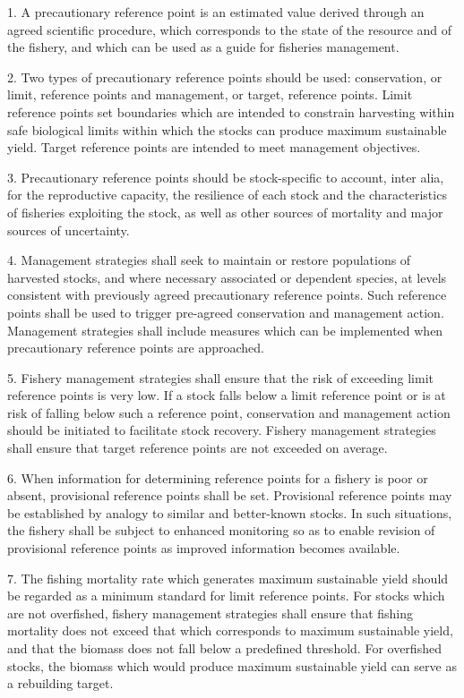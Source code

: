 \documentclass[a4paper,10pt]{article}
\begin{document}
 

1. A precautionary reference point is an estimated value derived through an agreed scientific procedure, which corresponds to the 
state of the resource and of the fishery, and which can be used as a guide for fisheries management.

2. Two types of precautionary reference points should be used: conservation, or limit, reference points and management, or target, 
reference points. Limit reference points set boundaries which are intended to constrain harvesting within safe biological 
limits within which the stocks can produce maximum sustainable yield. Target reference points are intended to meet management objectives.

3. Precautionary reference points should be stock-specific to account, inter alia, for the reproductive capacity, the resilience 
of each stock and the characteristics of fisheries exploiting the stock, as well as other sources of mortality and major sources of uncertainty.

4. Management strategies shall seek to maintain or restore populations of harvested stocks, and where necessary associated or 
dependent species, at levels consistent with previously agreed precautionary reference points. Such reference points shall be 
used to trigger pre-agreed conservation and management action. Management strategies shall include measures which can be implemented when precautionary reference points are approached.

5. Fishery management strategies shall ensure that the risk of exceeding limit reference points is very low. If a stock 
falls below a limit reference point or is at risk of falling below such a reference point, conservation and management 
action should be initiated to facilitate stock recovery. Fishery management strategies shall ensure that target reference points are not exceeded on average.

6. When information for determining reference points for a fishery is poor or absent, provisional reference points shall be set. 
Provisional reference points may be established by analogy to similar and better-known stocks. In such situations, the fishery 
shall be subject to enhanced monitoring so as to enable revision of provisional reference points as improved information becomes available.

7. The fishing mortality rate which generates maximum sustainable yield should be regarded as a minimum standard for limit reference 
points. For stocks which are not overfished, fishery management strategies shall ensure that fishing mortality does not exceed that 
which corresponds to maximum sustainable yield, and that the biomass does not fall below a predefined threshold. For overfished stocks, 
the biomass which would produce maximum sustainable yield can serve as a rebuilding target.
\end{document}
